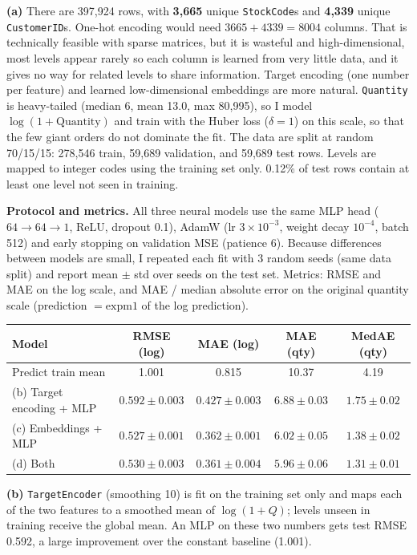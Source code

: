 \documentclass{article}
\newcounter{code}[section]
\begin{document}
\begin{solution}[]
  \textbf{(a)} There are 397{,}924 rows, with \textbf{3{,}665} unique \texttt{StockCode}s and \textbf{4{,}339} unique \texttt{CustomerID}s. One-hot encoding would need $3665+4339=8004$ columns. That is technically feasible with sparse matrices, but it is wasteful and high-dimensional, most levels appear rarely so each column is learned from very little data, and it gives no way for related levels to share information. Target encoding (one number per feature) and learned low-dimensional embeddings are more natural. \texttt{Quantity} is heavy-tailed (median 6, mean 13.0, max 80{,}995), so I model $\log(1+\text{Quantity})$ and train with the Huber loss ($\delta=1$) on this scale, so that the few giant orders do not dominate the fit. The data are split at random 70/15/15: 278{,}546 train, 59{,}689 validation, and 59{,}689 test rows. Levels are mapped to integer codes using the training set only. 0.12\% of test rows contain at least one level not seen in training.

  \textbf{Protocol and metrics.} All three neural models use the same MLP head ($64\to64\to1$, ReLU, dropout 0.1), AdamW (lr $3\times10^{-3}$, weight decay $10^{-4}$, batch 512) and early stopping on validation MSE (patience 6). Because differences between models are small, I repeated each fit with 3 random seeds (same data split) and report mean $\pm$ std over seeds on the test set. Metrics: RMSE and MAE on the log scale, and MAE / median absolute error on the original quantity scale (prediction $=\mathrm{expm1}$ of the log prediction).

  \begin{center}
    \begin{tabular}{lcccc}
      Model & RMSE (log) & MAE (log) & MAE (qty) & MedAE (qty) \\ \hline
      Predict train mean & 1.001 & 0.815 & 10.37 & 4.19 \\
      (b) Target encoding + MLP & $0.592\pm0.003$ & $0.427\pm0.003$ & $6.88\pm0.03$ & $1.75\pm0.02$ \\
      (c) Embeddings + MLP & $\mathbf{0.527\pm0.001}$ & $0.362\pm0.001$ & $6.02\pm0.05$ & $1.38\pm0.02$ \\
      (d) Both & $0.530\pm0.003$ & $\mathbf{0.361\pm0.004}$ & $\mathbf{5.96\pm0.06}$ & $\mathbf{1.31\pm0.01}$
    \end{tabular}
  \end{center}

  \textbf{(b)} \texttt{TargetEncoder} (smoothing 10) is fit on the training set only and maps each of the two features to a smoothed mean of $\log(1+Q)$; levels unseen in training receive the global mean. An MLP on these two numbers gets test RMSE 0.592, a large improvement over the constant baseline (1.001).


\end{solution}
\end{document}
